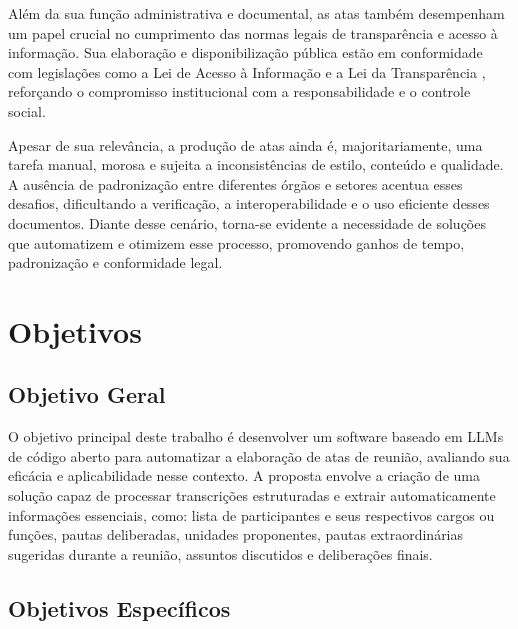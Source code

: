 Além da sua função administrativa e documental, as atas também desempenham um papel crucial no cumprimento das normas legais de transparência e acesso à informação. Sua elaboração e disponibilização pública estão em conformidade com legislações como a Lei de Acesso à Informação \cite{brasil_lei_2011} e a Lei da Transparência \cite{brasil_lei_2009}, reforçando o compromisso institucional com a responsabilidade e o controle social.

Apesar de sua relevância, a produção de atas ainda é, majoritariamente, uma tarefa manual, morosa e sujeita a inconsistências de estilo, conteúdo e qualidade. A ausência de padronização entre diferentes órgãos e setores acentua esses desafios, dificultando a verificação, a interoperabilidade e o uso eficiente desses documentos. Diante desse cenário, torna-se evidente a necessidade de soluções que automatizem e otimizem esse processo, promovendo ganhos de tempo, padronização e conformidade legal.

\section{Objetivos}

\label{sec:objetivos}



\subsection{Objetivo Geral}
\label{sec:objetivo-geral}


O objetivo principal deste trabalho é desenvolver um software baseado em LLMs de código aberto para automatizar a elaboração de atas de reunião, avaliando sua eficácia e aplicabilidade nesse contexto. A proposta envolve a criação de uma solução capaz de processar transcrições estruturadas e extrair automaticamente informações essenciais, como: lista de participantes e seus respectivos cargos ou funções, pautas deliberadas, unidades proponentes, pautas extraordinárias sugeridas durante a reunião, assuntos discutidos e deliberações finais.


\subsection{Objetivos Específicos}
\label{sec:objetivos-especificos}

